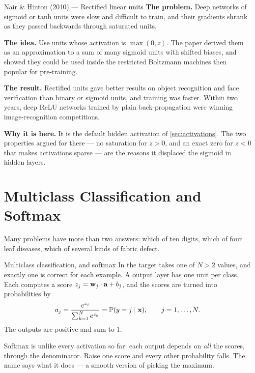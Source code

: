 \begin{researchspotlight}{Nair \& Hinton (2010) --- Rectified linear units}
\textbf{The problem.} Deep networks of sigmoid or tanh units were slow and
difficult to train, and their gradients shrank as they passed backwards through
saturated units.

\textbf{The idea.} Use units whose activation is $\max(0, z)$. The paper derived
them as an approximation to a sum of many sigmoid units with shifted biases,
and showed they could be used inside the restricted Boltzmann machines then
popular for pre-training.

\textbf{The result.} Rectified units gave better results on object recognition
and face verification than binary or sigmoid units, and training was faster.
Within two years, deep ReLU networks trained by plain back-propagation were
winning image-recognition competitions.

\textbf{Why it is here.} It is the default hidden activation of
\cref{sec:activations}. The two properties argued for there --- no saturation for
$z > 0$, and an exact zero for $z < 0$ that makes activations sparse --- are the
reasons it displaced the sigmoid in hidden layers.
\parencite{nair2010}
\end{researchspotlight}

\section{Multiclass Classification and Softmax}
\label{sec:softmax}

Many problems have more than two answers: which of ten digits, which of four
leaf diseases, which of several kinds of fabric defect.

\begin{defbox}{Multiclass classification, and softmax}
In  the target takes one of $N > 2$ values, and
exactly one is correct for each example. A  output layer has one
unit per class. Each computes a score $z_j = \mathbf{w}_j\cdot\mathbf{a} + b_j$, and the scores
are turned into probabilities by
\[
  a_j = \frac{e^{z_j}}{\sum_{k=1}^{N}e^{z_k}} = \mathbb{P}(y = j \mid \mathbf{x}),
  \qquad j = 1,\dots,N .
\]
The outputs are positive and sum to $1$.
\end{defbox}

Softmax is unlike every activation so far: each output depends on \emph{all}
the scores, through the denominator. Raise one score and every other probability
falls. The name says what it does --- a smooth version of picking the maximum.

